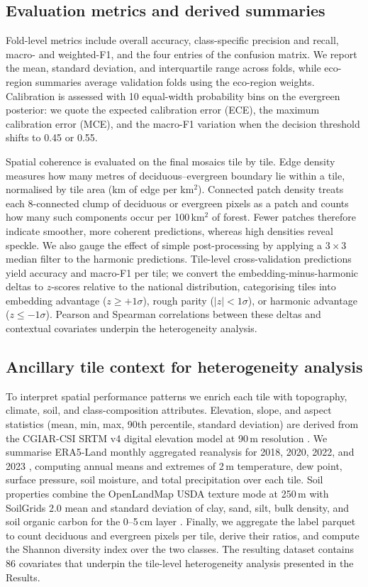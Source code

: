\documentclass[utf8]{FrontiersinHarvard}
\begin{document}
\subsection{Evaluation metrics and derived summaries}
Fold-level metrics include overall accuracy, class-specific precision and recall, macro- and weighted-F1, and the four entries of the confusion matrix. We report the mean, standard deviation, and interquartile range across folds, while eco-region summaries average validation folds using the eco-region weights. Calibration is assessed with 10 equal-width probability bins on the evergreen posterior: we quote the expected calibration error (ECE), the maximum calibration error (MCE), and the macro-F1 variation when the decision threshold shifts to 0.45 or 0.55.

Spatial coherence is evaluated on the final mosaics tile by tile. Edge density measures how many metres of deciduous–evergreen boundary lie within a tile, normalised by tile area (km of edge per km$^2$). Connected patch density treats each 8-connected clump of deciduous or evergreen pixels as a patch and counts how many such components occur per 100\,km$^2$ of forest. Fewer patches therefore indicate smoother, more coherent predictions, whereas high densities reveal speckle. We also gauge the effect of simple post-processing by applying a \(3 \times 3\) median filter to the harmonic predictions. Tile-level cross-validation predictions yield accuracy and macro-F1 per tile; we convert the embedding-minus-harmonic deltas to $z$-scores relative to the national distribution, categorising tiles into embedding advantage (\(z \ge +1\sigma\)), rough parity (\(|z| < 1\sigma\)), or harmonic advantage (\(z \le -1\sigma\)). Pearson and Spearman correlations between these deltas and contextual covariates underpin the heterogeneity analysis.

\subsection{Ancillary tile context for heterogeneity analysis}
To interpret spatial performance patterns we enrich each tile with topography, climate, soil, and class-composition attributes. Elevation, slope, and aspect statistics (mean, min, max, 90th percentile, standard deviation) are derived from the CGIAR-CSI SRTM v4 digital elevation model at 90\,m resolution \citep{Jarvis2008SRTM}. We summarise ERA5-Land monthly aggregated reanalysis for 2018, 2020, 2022, and 2023 \citep{MunozSabater2021ERA5Land}, computing annual means and extremes of 2\,m temperature, dew point, surface pressure, soil moisture, and total precipitation over each tile. Soil properties combine the OpenLandMap USDA texture mode at 250\,m \citep{Hengl2021OpenLandMap} with SoilGrids 2.0 mean and standard deviation of clay, sand, silt, bulk density, and soil organic carbon for the 0–5\,cm layer \citep{Poggio2021SoilGrids}. Finally, we aggregate the label parquet to count deciduous and evergreen pixels per tile, derive their ratios, and compute the Shannon diversity index over the two classes. The resulting dataset contains 86 covariates that underpin the tile-level heterogeneity analysis presented in the Results.
\end{document}
